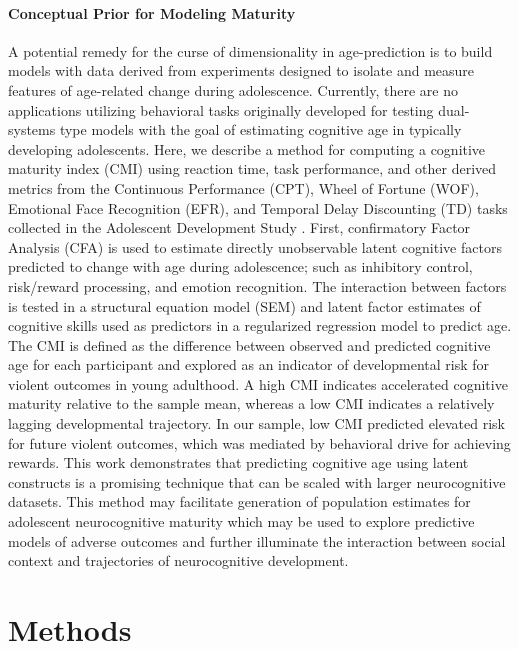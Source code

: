 \documentclass[utf8]{frontiersSCNS} %
\begin{document}
\paragraph{Conceptual Prior for Modeling Maturity} A potential remedy for the curse of dimensionality in age-prediction is to build models with data derived from experiments designed to isolate and measure features of age-related change during adolescence. Currently, there are no applications utilizing behavioral tasks originally developed for testing dual-systems type models with the goal of estimating cognitive age in typically developing adolescents. Here, we describe a method for computing a cognitive maturity index (CMI) using reaction time, task performance, and other derived metrics from the Continuous Performance (CPT), Wheel of Fortune (WOF), Emotional Face Recognition (EFR), and Temporal Delay Discounting (TD) tasks collected in the Adolescent Development Study \citep{Fishbein2016}. First, confirmatory Factor Analysis (CFA) is used to estimate directly unobservable latent cognitive factors predicted to change with age during adolescence; such as inhibitory control, risk/reward processing, and emotion recognition. The interaction between factors is tested in a structural equation model (SEM) and latent factor estimates of cognitive skills used as predictors in a regularized regression model to predict age. The CMI is defined as the difference between observed and predicted cognitive age for each participant and explored as an indicator of developmental risk for violent outcomes in young adulthood. A high CMI indicates accelerated cognitive maturity relative to the sample mean, whereas a low CMI indicates a relatively lagging developmental trajectory. In our sample, low CMI predicted elevated risk for future violent outcomes, which was mediated by behavioral drive for achieving rewards. This work demonstrates that predicting cognitive age using latent constructs is a promising technique that can be scaled with larger neurocognitive datasets. This method may facilitate generation of population estimates for adolescent neurocognitive maturity which may be used to explore predictive models of adverse outcomes and further illuminate the interaction between social context and trajectories of neurocognitive development. 
\section{Methods}
\end{document}
